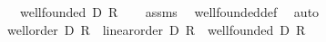 \begin{isabellebody}
\ \ \ {\isachardoublequoteopen}well{\isacharunderscore}{\kern0pt}founded\ D\ R{\isachardoublequoteclose}\isanewline
%
\isadelimproof
\ \ %
\endisadelimproof
%
\isatagproof
{}\isamarkupfalse%
\ assms\ \isamarkupfalse%
\ well{\isacharunderscore}{\kern0pt}founded{\isacharunderscore}{\kern0pt}def\ \isamarkupfalse%
\ auto%
\endisatagproof
{\isafoldproof}%
%
\isadelimproof
\isanewline
%
\endisadelimproof
\isanewline
{}\isamarkupfalse%
\ {\isachardoublequoteopen}well{\isacharunderscore}{\kern0pt}order\ D\ R\ {\isasymequiv}\ linear{\isacharunderscore}{\kern0pt}order\ D\ R\ {\isasymand}\ well{\isacharunderscore}{\kern0pt}founded\ D\ R{\isachardoublequoteclose}\isanewline
\isanewline
%
\isadelimtheory
\isanewline
%
\endisadelimtheory
%
\isatagtheory
{}\isamarkupfalse%
%
\endisatagtheory
{\isafoldtheory}%
%
\isadelimtheory
%
\endisadelimtheory
%
\end{isabellebody}%
\endinput
